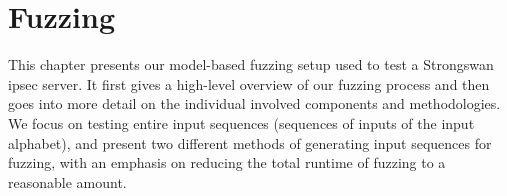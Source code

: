 %
%
% 
% 
% 

\chapter{Fuzzing}

\label{chap:Fuzzing}

\iffalse
\section{Environment Setup} \label{sec:fuzzenv}
We ran all our fuzzing tests in the same virtual network setup we used for our automata learning, on the same Ubuntu 22.04 LTS distributions. We again designated one \ac{vm} as the initiator which would send the fuzzed messages and the other one as the responder to create a typical client-server setup. All settings on the used VMs remained the same as while learning to ensure that no discrepancies were introduced by different environment settings. The \ac{sut} was also the same Strongswan server used for learning. The major difference to learning is that for fuzzing, we no longer require \textsc{AALpy}. Our only real dependency, apart from our mapper class, is the Python fuzzing framework boofuzz, version 0.4.1, which we use for input generation. 
\fi

This chapter presents our model-based fuzzing setup used to test a Strongswan \ac{ipsec} server. It first gives a high-level overview of our fuzzing process and then goes into more detail on the individual involved components and methodologies. We focus on testing entire input sequences (sequences of inputs of the input alphabet), and present two different methods of generating input sequences for fuzzing, with an emphasis on reducing the total runtime of fuzzing to a reasonable amount.

